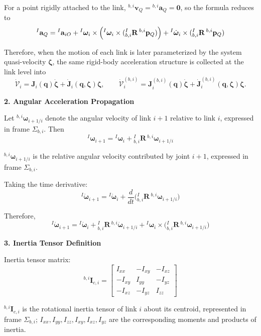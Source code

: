 \documentclass[12pt,a4paper]{report}
\newcommand{\newsymbols}[1]{\par\noindent{}#1\par\vspace{0.35em}}
\newcommand{\vect}[1]{\mathbf{#1}}
\newcommand{\mat}[1]{\mathbf{#1}}
\newcommand{\Frame}[1]{\Sigma_{#1}}
\newcommand{\Rot}[2]{{}_{#1}^{#2}\mathbf{R}}
\newcommand{\angvel}{\boldsymbol{\omega}}
\begin{document}
For a point rigidly attached to the link, ${}^{b,i}\vect{v}_{Q} = {}^{b,i}\vect{a}_{Q} = \vect{0}$, so the formula reduces to
\begin{equation}
{}^{I}\vect{a}_{Q}
=
{}^{I}\vect{a}_{iO}
+
{}^{I}\angvel_{i} \times \Bigl({}^{I}\angvel_{i} \times (\Rot{b,i}{I}\,{}^{b,i}\vect{p}_{Q})\Bigr)
+
{}^{I}\dot{\angvel}_{i} \times (\Rot{b,i}{I}\,{}^{b,i}\vect{p}_{Q})
\end{equation}

Therefore, when the motion of each link is later parameterized by the system quasi-velocity $\boldsymbol{\zeta}$, the same rigid-body acceleration structure is collected at the link level into
\begin{equation}
\dot{\mathcal{V}}_i
=
\mathbf{J}_i(\mathbf{q})\dot{\boldsymbol{\zeta}}
+
\dot{\mathbf{J}}_i(\mathbf{q},\boldsymbol{\zeta})\boldsymbol{\zeta},
\qquad
\dot{\mathcal{V}}_i^{(b,i)}
=
\mathbf{J}_i^{(b,i)}(\mathbf{q})\dot{\boldsymbol{\zeta}}
+
\dot{\mathbf{J}}_i^{(b,i)}(\mathbf{q},\boldsymbol{\zeta})\boldsymbol{\zeta}.
\end{equation}

\textbf{2. Angular Acceleration Propagation}

Let ${}^{b,i}\angvel_{i+1/i}$ denote the angular velocity of link $i+1$ relative to link $i$, expressed in frame $\Frame{b,i}$. Then
\begin{equation}
{}^{I}\angvel_{i+1}
=
{}^{I}\angvel_{i}
+
\Rot{b,i}{I}\,{}^{b,i}\angvel_{i+1/i}
\end{equation}
\newsymbols{${}^{b,i}\angvel_{i+1/i}$ is the relative angular velocity contributed by joint $i+1$, expressed in frame $\Frame{b,i}$.}

Taking the time derivative:
\begin{equation}
{}^{I}\dot{\angvel}_{i+1}
=
{}^{I}\dot{\angvel}_{i}
+
\frac{d}{dt}\bigl(\Rot{b,i}{I}\,{}^{b,i}\angvel_{i+1/i}\bigr)
\end{equation}

Therefore,
\begin{equation}
{}^{I}\dot{\angvel}_{i+1}
=
{}^{I}\dot{\angvel}_{i}
+
\Rot{b,i}{I}\,{}^{b,i}\dot{\angvel}_{i+1/i}
+
{}^{I}\angvel_{i} \times \bigl(\Rot{b,i}{I}\,{}^{b,i}\angvel_{i+1/i}\bigr)
\end{equation}

\textbf{3. Inertia Tensor Definition}

Inertia tensor matrix:
\begin{equation}
{}^{b,i}\mat{I}_{c,i}
=
\begin{bmatrix}
I_{xx} & -I_{xy} & -I_{xz} \\
-I_{xy} & I_{yy} & -I_{yz} \\
-I_{xz} & -I_{yz} & I_{zz}
\end{bmatrix}
\end{equation}
\newsymbols{${}^{b,i}\mat{I}_{c,i}$ is the rotational inertia tensor of link $i$ about its centroid, represented in frame $\Frame{b,i}$; $I_{xx},I_{yy},I_{zz},I_{xy},I_{xz},I_{yz}$ are the corresponding moments and products of inertia.}
\end{document}

